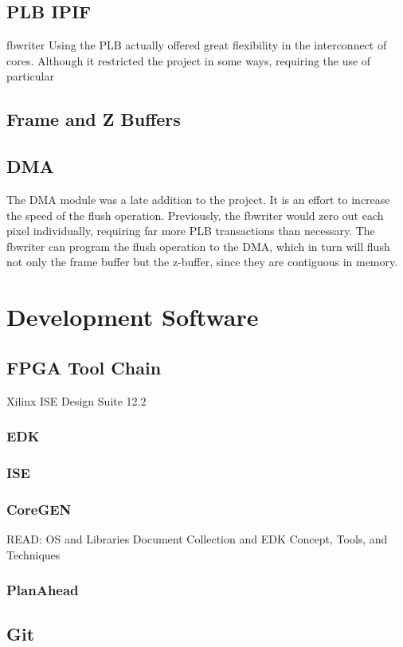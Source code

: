 \documentclass[letterpaper,10pt]{article}
\begin{document}
\subsection{PLB IPIF}
fbwriter
Using the PLB actually offered great flexibility in the interconnect of cores.  Although it restricted the project in some ways, requiring the use of particular 

\subsection{Frame and Z Buffers}	

\subsection{DMA}

The DMA module was a late addition to the project.  It is an effort to increase the speed of the flush operation.  Previously, the fbwriter would zero out each pixel individually, requiring far more PLB transactions than necessary.  The fbwriter can program the flush operation to the DMA, which in turn will flush not only the frame buffer but the z-buffer, since they are contiguous in memory.

\section{Development Software}
\subsection{FPGA Tool Chain}
Xilinx ISE Design Suite 12.2

\subsubsection{EDK}
\subsubsection{ISE}
\subsubsection{CoreGEN}
READ: OS and Libraries Document Collection and EDK Concept, Tools, and Techniques
\subsubsection{PlanAhead}

\subsection{Git}
\end{document}
